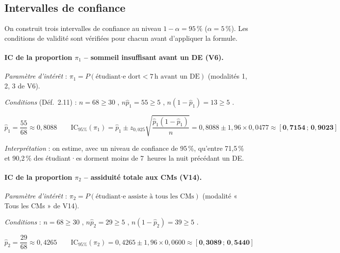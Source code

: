 
\subsection{Intervalles de confiance}

On construit trois intervalles de confiance au niveau $1-\alpha = 95\,\%$
($\alpha = 5\,\%$).
Les conditions de validité sont vérifiées pour chacun avant d'appliquer la formule.

\paragraph{IC de la proportion $\pi_1$ -- sommeil insuffisant avant un DE (V6).}

\textit{Paramètre d'intérêt} : $\pi_1 = P(\text{étudiant·e dort} < 7\,\text{h avant un DE})$
(modalités 1, 2, 3 de V6).

\textit{Conditions} (Déf.~2.11) : $n = 68 \geq 30$ {\checkmark},
$n\hat{p}_1 = 55 \geq 5$ {\checkmark}, $n(1-\hat{p}_1) = 13 \geq 5$ {\checkmark}.

\[
  \hat{p}_1 = \frac{55}{68} \approx 0{,}8088
  \qquad
  \text{IC}_{95\%}(\pi_1)
  = \hat{p}_1 \pm z_{0{,}025}\sqrt{\frac{\hat{p}_1(1-\hat{p}_1)}{n}}
  = 0{,}8088 \pm 1{,}96 \times 0{,}0477
  \approx \boldsymbol{[0{,}7154\,;\,0{,}9023]}
\]

\textit{Interprétation} : on estime, avec un niveau de confiance de 95\,\%, qu'entre
71,5\,\% et 90,2\,\% des étudiant·es dorment moins de 7~heures la nuit précédant un DE.

\paragraph{IC de la proportion $\pi_2$ -- assiduité totale aux CMs (V14).}

\textit{Paramètre d'intérêt} : $\pi_2 = P(\text{étudiant·e assiste à tous les CMs})$
(modalité « Tous les CMs » de V14).

\textit{Conditions} : $n = 68 \geq 30$ {\checkmark},
$n\hat{p}_2 = 29 \geq 5$ {\checkmark}, $n(1-\hat{p}_2) = 39 \geq 5$ {\checkmark}.

\[
  \hat{p}_2 = \frac{29}{68} \approx 0{,}4265
  \qquad
  \text{IC}_{95\%}(\pi_2)
  = 0{,}4265 \pm 1{,}96 \times 0{,}0600
  \approx \boldsymbol{[0{,}3089\,;\,0{,}5440]}
\]

